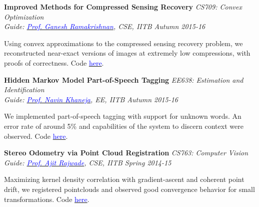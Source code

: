 \documentclass[margin,line]{res}
\newenvironment{list1}{
  \begin{list}{\ding{113}}{%
      \setlength{\itemsep}{0in}
      \setlength{\parsep}{0in} \setlength{\parskip}{0in}
      \setlength{\topsep}{0in} \setlength{\partopsep}{0in} 
      \setlength{\leftmargin}{0.17in}}}{\end{list}}
\begin{document}
\begin{resume}
\vspace*{-0.1in}

{\bf Improved Methods for Compressed Sensing Recovery} \hfill {\it CS709: Convex Optimization} \\
{\em Guide: \href{https://www.cse.iitb.ac.in/~ganesh/}{\textcolor{blue}{Prof. Ganesh Ramakrishnan}}, CSE, IITB \hfill Autumn 2015-16} \\
\vspace*{-.15in}
\begin{list1}
\item[] Using convex approximations to the compressed sensing recovery problem, we reconstructed near-exact versions of images at extremely low compressions, with proofs of correctness. Code \href{https://github.com/alankarkotwal/cs-rank-minimization}{\textcolor{blue} {here}}.
\end{list1}

\vspace*{-0.1in}

{\bf Hidden Markov Model Part-of-Speech Tagging} \hfill \textit{EE638: Estimation and Identification} \\
{\em Guide: \href{https://www.ee.iitb.ac.in/course/~ee638/Navin}{\textcolor{blue}{Prof. Navin Khaneja}}, EE, IITB \hfill Autumn 2015-16} \\
\vspace*{-.15in}
\begin{list1}
\item[] We implemented part-of-speech tagging with support for unknown words. An error rate of around 5\% and capabilities of the system to discern context were observed. Code \href{https://github.com/alankarkotwal/pos-tagging}{\textcolor{blue} {here}}.
\end{list1}

\vspace*{-0.1in}

{\bf Stereo Odometry via Point Cloud Registration} \hfill \textit{CS763: Computer Vision} \\
{\em Guide: \href{https://www.cse.iitb.ac.in/~ajitvr}{\textcolor{blue}{Prof. Ajit Rajwade}}, CSE, IITB \hfill Spring 2014-15} \\
\vspace*{-.15in}
\begin{list1}
\item[] Maximizing kernel density correlation with gradient-ascent and coherent point drift, we registered pointclouds and observed good convergence behavior for small transformations. Code \href{https://github.com/alankarkotwal/stereo-vo}{\textcolor{blue} {here}}.
\end{list1}


\end{resume}
\end{document}

